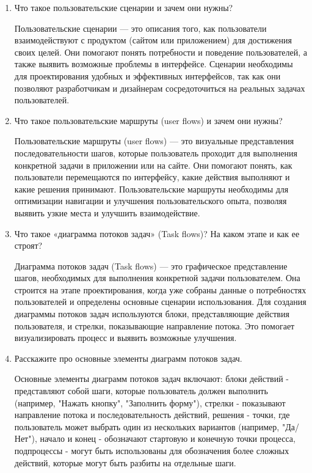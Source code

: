 \begin{enumerate}
    \item Что такое пользовательские сценарии и зачем они нужны?

    Пользовательские сценарии — это описания того, как пользователи взаимодействуют с продуктом (сайтом или приложением) для достижения своих целей. Они помогают понять потребности и поведение пользователей, а также выявить возможные проблемы в интерфейсе. Сценарии необходимы для проектирования удобных и эффективных интерфейсов, так как они позволяют разработчикам и дизайнерам сосредоточиться на реальных задачах пользователей.
    \item Что такое пользовательские маршруты (user flows) и зачем они нужны?

    Пользовательские маршруты (user flows) — это визуальные представления последовательности шагов, которые пользователь проходит для выполнения конкретной задачи в приложении или на сайте. Они помогают понять, как пользователи перемещаются по интерфейсу, какие действия выполняют и какие решения принимают. Пользовательские маршруты необходимы для оптимизации навигации и улучшения пользовательского опыта, позволяя выявить узкие места и улучшить взаимодействие.
    \item Что такое «диаграмма потоков задач» (Task flows)? На каком этапе и как ее строят?

    Диаграмма потоков задач (Task flows) — это графическое представление шагов, необходимых для выполнения конкретной задачи пользователем. Она строится на этапе проектирования, когда уже собраны данные о потребностях пользователей и определены основные сценарии использования. Для создания диаграммы потоков задач используются блоки, представляющие действия пользователя, и стрелки, показывающие направление потока. Это помогает визуализировать процесс и выявить возможные улучшения.
    \item Расскажите про основные элементы диаграмм потоков задач.

    Основные элементы диаграмм потоков задач включают:
    блоки действий - представляют собой шаги, которые пользователь должен выполнить (например, "Нажать кнопку", "Заполнить форму"),
    стрелки - показывают направление потока и последовательность действий,
    решения - точки, где пользователь может выбрать один из нескольких вариантов (например, "Да/Нет"),
    начало и конец - обозначают стартовую и конечную точки процесса,
    подпроцессы - могут быть использованы для обозначения более сложных действий, которые могут быть разбиты на отдельные шаги.
\end{enumerate}


